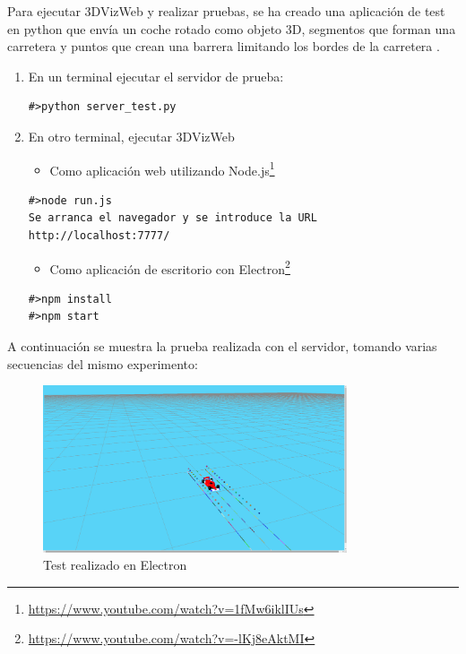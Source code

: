 Para ejecutar 3DVizWeb y realizar pruebas, se ha creado una aplicación de test en python que envía un coche rotado como objeto 3D, segmentos que forman una carretera y puntos que crean una barrera limitando los bordes de la carretera .

\begin{enumerate}
\item En un terminal ejecutar el servidor de prueba:

\begin{lstlisting}[caption= Ejecutar servidor de prueba, label=cod.testserver]
#>python server_test.py
\end{lstlisting}

\item En otro terminal, ejecutar 3DVizWeb

\begin{itemize}
\item Como aplicación web utilizando Node.js\footnote{\url{https://www.youtube.com/watch?v=1fMw6iklIUs}}
\end{itemize}
\begin{lstlisting}[caption= Ejecución con Node.js, label=cod.dronenodejs]
#>node run.js
Se arranca el navegador y se introduce la URL http://localhost:7777/
\end{lstlisting}
\begin{itemize}
\item Como aplicación de escritorio con Electron\footnote{\url{https://www.youtube.com/watch?v=-lKj8eAktMI}}
\end{itemize}
\begin{lstlisting}[caption= Ejecución con Electron, label=cod.droneelectron]
#>npm install
#>npm start
\end{lstlisting}

\end{enumerate}

A continuación se muestra la prueba realizada con el servidor, tomando varias secuencias del mismo experimento:

\begin{figure}[H]
  \begin{center}
    \includegraphics[width=0.8\textwidth]{figures/3DVizWeb.png}
    		\caption{Test realizado en Electron}
		\label{fig.test3dviz1}
		\end{center}
\end{figure}













